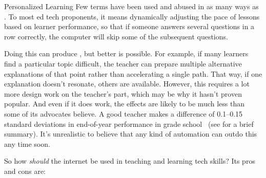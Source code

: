 \begin{aside}{Personalized Learning}
  Few terms have been used and abused in as many ways
  as .
  To most ed tech proponents,
  it means dynamically adjusting the pace of lessons based on learner performance,
  so that if someone answers several questions in a row correctly,
  the computer will skip some of the subsequent questions.

  Doing this can produce
  ,
  but better is possible.
  For example,
  if many learners find a particular topic difficult,
  the teacher can prepare multiple alternative explanations of that point
  rather than accelerating a single path.
  That way,
  if one explanation doesn't resonate,
  others are available.
  However,
  this requires a lot more design work on the teacher's part,
  which may be why it hasn't proven popular.
  And even if it does work,
  the effects are likely to be much less than some of its advocates believe.
  A good teacher makes a difference of 0.1--0.15 standard deviations in end-of-year performance in grade school~\cite{Chet2014}
  (see  for a brief summary).
  It's unrealistic to believe that any kind of automation can outdo this any time soon.
\end{aside}

So how \emph{should} the internet be used in teaching and learning tech skills?
Its pros and cons are:

